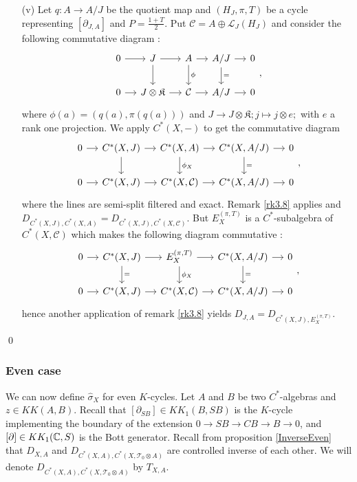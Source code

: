 \begin{dem}
\begin{enumerate}
\item[(v)] Let $q:A\rightarrow A/J$ be the quotient map and $(H_J, \pi, T)$ be a cycle representing $[\partial_{J,A}]$ and $P=\frac{1+T}{2}$. Put $\mathcal C=A\oplus \mathcal L_J(H_J)$ and consider the following commutative diagram :
\[\begin{tikzcd}[column sep = small]
0\arrow{r} &J\arrow{r}\arrow{d} & A \arrow{r}\arrow{d}{\phi}& A/J\arrow{r}\arrow{d}{=} & 0\\
0\arrow{r} & J\otimes \mathfrak K\arrow{r} & \mathcal C \arrow{r}& A/J\arrow{r} & 0
\end{tikzcd},\]
where $\phi(a) = (q(a),\pi(q(a)))$ and $J\rightarrow J\otimes \mathfrak K; j\mapsto j\otimes e;$ with $e$ a rank one projection. We apply $C^*(X,-)$ to get the commutative diagram
\[\begin{tikzcd}[column sep = small]
0\arrow{r} & C^*(X,J)\arrow{r}\arrow{d} & C^*(X,A) \arrow{r}\arrow{d}{\phi_X}& C^*(X,A/J)\arrow{r}\arrow{d}{=} & 0\\
0\arrow{r} & C^*(X,J)\arrow{r} & C^*(X,\mathcal C) \arrow{r}& C^*(X,A/J)\arrow{r} & 0
\end{tikzcd},\]
where the lines are semi-split filtered and exact. Remark \ref{rk3.8} applies and $D_{C^*(X,J),C^*(X,A)} = D_{C^*(X,J),C^*(X,\mathcal C)}$. But $E^{(\pi,T)}_X$ is a $C^*$-subalgebra of $C^*(X,\mathcal C)$ which makes the following diagram commutative :
\[\begin{tikzcd}[column sep = small]
0\arrow{r} & C^*(X,J)\arrow{r}\arrow{d}{=} & E_X^{(\pi,T)} \arrow{r}\arrow{d}{\phi_X}& C^*(X,A/J)\arrow{r}\arrow{d}{=} & 0\\
0\arrow{r} & C^*(X,J)\arrow{r} & C^*(X,\mathcal C) \arrow{r}& C^*(X,A/J)\arrow{r} & 0
\end{tikzcd},\]
hence another application of remark \ref{rk3.8} yields $D_{J,A} = D_{C^*(X,J),E_X^{(\pi,T)}}$. 
\end{enumerate}
\qed
\end{dem}

\subsubsection{Even case} %

We can now define $\hat\sigma_X$ for even $K$-cycles. Let $A$ and $B$ be two $C^*$-algebras and $z\in KK(A,B)$. Recall that $[\partial_{SB}]\in KK_1(B,SB)$ is the $K$-cycle implementing the boundary of the extension $0\rightarrow SB\rightarrow CB\rightarrow B\rightarrow 0$, and $[\partial]\in KK_1(\mathbb C,S)$ is the Bott generator. Recall from proposition \ref{InverseEven} that $D_{X,A}$  and $D_{ C^*(X,A),C^*(X,\mathcal T_0\otimes A) }$ are controlled inverse of each other. We will denote $D_{ C^*(X,A),C^*(X,\mathcal T_0\otimes A) }$ by $T_{X,A}$.\\


